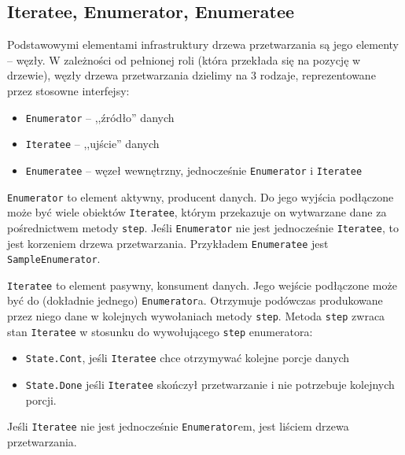 \subsection{Iteratee, Enumerator, Enumeratee}

Podstawowymi elementami infrastruktury drzewa przetwarzania są jego elementy -- węzły. W zależności
od pełnionej roli (która przekłada się na pozycję w drzewie), węzły drzewa przetwarzania dzielimy na
3 rodzaje, reprezentowane przez stosowne interfejsy:

\begin{itemize}

  \item \texttt{Enumerator} -- ,,źródło'' danych

  \item \texttt{Iteratee} -- ,,ujście'' danych

  \item \texttt{Enumeratee} -- węzeł wewnętrzny, jednocześnie \texttt{Enumerator} i
    \texttt{Iteratee}

\end{itemize}

\texttt{Enumerator} to element aktywny, producent danych. Do jego wyjścia podłączone może być wiele
obiektów \texttt{Iteratee}, którym przekazuje on wytwarzane dane za pośrednictwem metody
\texttt{step}. Jeśli \texttt{Enumerator} nie jest jednocześnie \texttt{Iteratee}, to jest korzeniem
drzewa przetwarzania.  Przykładem \texttt{Enumeratee} jest \texttt{SampleEnumerator}.

\texttt{Iteratee} to element pasywny, konsument danych. Jego wejście podłączone może być do
(dokładnie jednego) \texttt{Enumerator}a. Otrzymuje podówczas produkowane przez niego dane w
kolejnych wywołaniach metody \texttt{step}. Metoda \texttt{step} zwraca stan \texttt{Iteratee} w
stosunku do wywołującego \texttt{step} enumeratora:

\begin{itemize}

  \item \texttt{State.Cont}, jeśli \texttt{Iteratee} chce otrzymywać kolejne porcje danych

  \item \texttt{State.Done} jeśli \texttt{Iteratee} skończył przetwarzanie i nie potrzebuje
    kolejnych porcji.

\end{itemize}

Jeśli \texttt{Iteratee} nie jest jednocześnie \texttt{Enumerator}em, jest liściem drzewa
przetwarzania.

